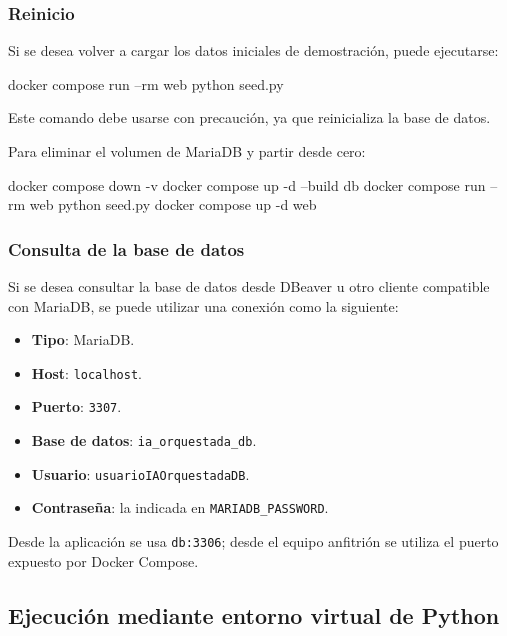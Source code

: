 \subsubsection{Reinicio}

Si se desea volver a cargar los datos iniciales de demostración, puede ejecutarse:

\begin{bloqueTerminal}[title={Recarga de datos iniciales}]
	docker compose run --rm web python seed.py
\end{bloqueTerminal}

Este comando debe usarse con precaución, ya que reinicializa la base de datos.

Para eliminar el volumen de MariaDB y partir desde cero:

\begin{bloqueTerminal}[title={Reinicio completo de la base de datos}]
	docker compose down -v
	docker compose up -d --build db
	docker compose run --rm web python seed.py
	docker compose up -d web
\end{bloqueTerminal}

\subsubsection{Consulta de la base de datos}

Si se desea consultar la base de datos desde DBeaver u otro cliente compatible con MariaDB, se puede utilizar una conexión como la siguiente:

\begin{itemize}
	\item \textbf{Tipo}: MariaDB.
	\item \textbf{Host}: \texttt{localhost}.
	\item \textbf{Puerto}: \texttt{3307}.
	\item \textbf{Base de datos}: \texttt{ia\_orquestada\_db}.
	\item \textbf{Usuario}: \texttt{usuarioIAOrquestadaDB}.
	\item \textbf{Contraseña}: la indicada en \texttt{MARIADB\_PASSWORD}.
\end{itemize}

Desde la aplicación se usa \texttt{db:3306}; desde el equipo anfitrión se utiliza el puerto expuesto por Docker Compose.

\subsection{Ejecución mediante entorno virtual de Python}


